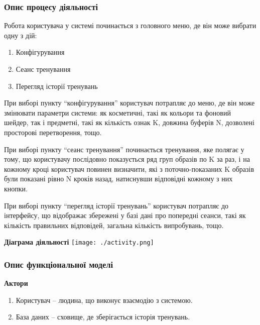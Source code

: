 \subsubsection{Опис процесу діяльності}

Робота користувача у системі починається з головного меню, де він може вибрати одну з дій:

\begin{enumerate}
  \item Конфігурування
  \item Сеанс тренування
  \item Перегляд історії тренувань
\end{enumerate}

При виборі пункту ``конфігурування'' користувач потрапляє до меню, де він може змінювати параметри системи: як косметичні, такі як кольори та фоновий шейдер, так і предметні, такі як кількість ознак K, довжина буферів N, дозволені просторові перетворення, тощо.

При виборі пункту ``сеанс тренування'' починається тренування, яке полягає у тому, що користувачу послідовно показується ряд груп образів по K за раз, і на кожному кроці користувач повинен визначити, які з поточно-показаних K образів були показані рівно N кроків назад, натиснувши відповідні кожному з них кнопки.

При виборі пункту ``перегляд історії тренувань'' користувач потрапляє до інтерфейсу, що відображає збережені у базі дані про попередні сеанси, такі як кількість правильних відповідей, загальна кількість випробувань, тощо.

\begin{center}
  \textbf{Діаграма діяльності}
  \texttt{[image: ./activity.png]}
\end{center}

\subsubsection{Опис функціональної моделі}

\begin{center}
  \textbf{Актори}
\end{center}

\begin{enumerate}
  \item Користувач – людина, що виконує взаємодію з системою.
  \item База даних – сховище, де зберігається історія тренувань.
\end{enumerate}

